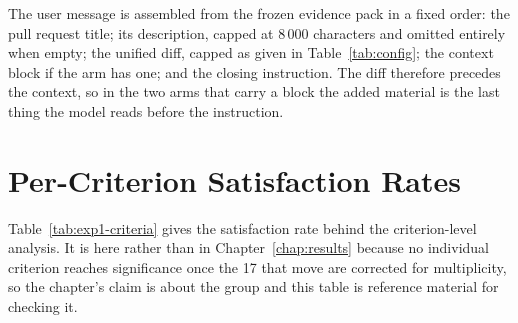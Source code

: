 The user message is assembled from the frozen evidence pack in a fixed order: the
pull request title; its description, capped at 8\,000 characters and omitted
entirely when empty; the unified diff, capped as given in
Table~\ref{tab:config}; the context block if the arm has one; and the closing
instruction. The diff therefore precedes the context, so in the two arms that
carry a block the added material is the last thing the model reads before the
instruction.

\section{Per-Criterion Satisfaction Rates}

Table~\ref{tab:exp1-criteria} gives the satisfaction rate behind the
criterion-level analysis. It is here rather than in
Chapter~\ref{chap:results} because no
individual criterion reaches significance once the 17 that move are corrected
for multiplicity, so the chapter's claim is about the group and this table is
reference material for checking it.

